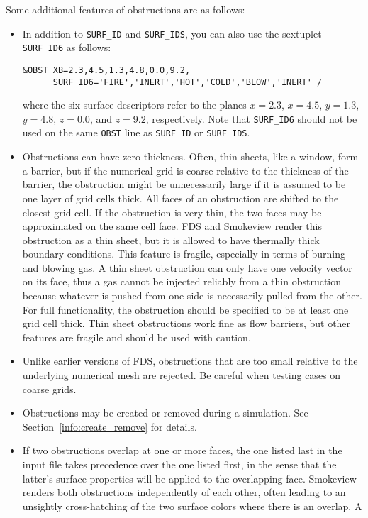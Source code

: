 \documentclass[11pt]{book}
\newcommand{\ct}{\tt\small}
\begin{document}
\noindent
Some additional features of obstructions are as follows:
\begin{itemize}
\item In addition to {\ct SURF\_ID} and {\ct SURF\_IDS}, you can also use
the sextuplet {\ct SURF\_ID6} as follows:

\footnotesize
\begin{verbatim}
&OBST XB=2.3,4.5,1.3,4.8,0.0,9.2,
      SURF_ID6='FIRE','INERT','HOT','COLD','BLOW','INERT' /
\end{verbatim}
\normalsize
where the six surface descriptors refer to the planes $x=2.3$, $x=4.5$, $y=1.3$, $y=4.8$,
$z=0.0$, and $z=9.2$, respectively.
Note that {\ct SURF\_ID6} should not be used on the same {\ct OBST}
line as {\ct SURF\_ID} or {\ct SURF\_IDS}.
\item Obstructions can have zero thickness. Often, thin sheets, like a window, form a barrier,
but if the numerical grid is coarse relative to the thickness of the barrier, the obstruction
might be unnecessarily large if it is assumed to be one layer of grid cells thick. All faces
of an obstruction are shifted to the closest grid cell. If the obstruction is very thin, the two
faces may be approximated on the same cell face. FDS and Smokeview render
this obstruction as a thin sheet, but it is allowed to have thermally
thick boundary conditions. This feature is fragile, especially in terms
of burning and blowing gas. A thin sheet obstruction can only have one velocity
vector on its face, thus a gas cannot be injected reliably from a
thin obstruction because whatever is pushed from one side is necessarily pulled from the other.
For full functionality, the obstruction should be specified to
be at least one grid cell thick. Thin sheet obstructions
work fine as flow barriers, but other features are fragile and should be used with
caution.
\item Unlike earlier versions of FDS, obstructions that are
too small relative to the underlying numerical mesh are rejected.
Be careful when testing cases on coarse grids.
\item Obstructions may be created or removed during a simulation. See
Section~\ref{info:create_remove} for details.
\item If two obstructions overlap at one or more faces, the one listed last in the input file takes precedence over the one
listed first, in the sense that the latter's surface properties will be applied to the overlapping face. Smokeview renders both obstructions
independently of each other, often leading to an unsightly cross-hatching of the two surface colors where there is an overlap. A

\end{itemize}
\end{document}
